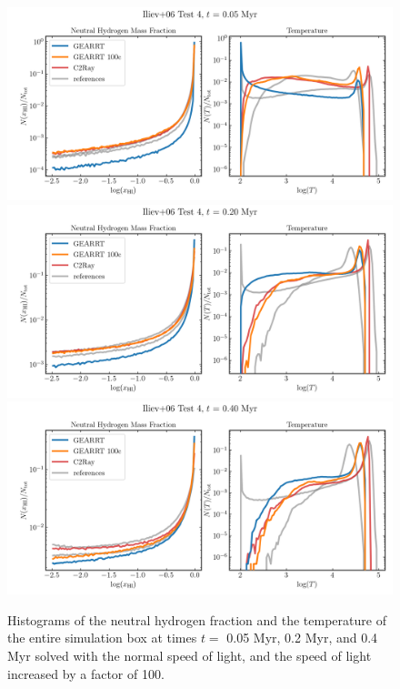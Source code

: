 \begin{figure}
 \centering
 \includegraphics[width=\textwidth]{figures/RHD/Iliev4/output_0001-Histogram.png}\\
 \includegraphics[width=\textwidth]{figures/RHD/Iliev4/output_0004-Histogram.png}\\
 \includegraphics[width=\textwidth]{figures/RHD/Iliev4/output_0008-Histogram.png}
\caption{
Histograms of the neutral hydrogen fraction and the temperature of the entire simulation box at
times $t = $ 0.05 Myr, 0.2 Myr, and 0.4 Myr solved with the normal speed of light, and the speed of
light increased by a factor of 100.
}
 \label{fig:iliev4-histograms}
\end{figure}




